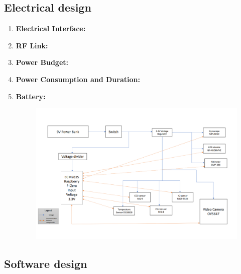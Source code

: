\documentclass[11pt]{article}
\begin{document}
\subsection{Electrical design}
\begin{enumerate}
\item \textbf{Electrical Interface:}
\item \textbf{RF Link:}
\item \textbf{Power Budget:}
\item \textbf{Power Consumption and Duration:}
\item \textbf{Battery:} 

\begin{figure}[hbt!]
\includegraphics[width=15cm]{Schema_electrica}
\centering
\end{figure}
\end{enumerate}

\subsection{Software design}
\end{document}
